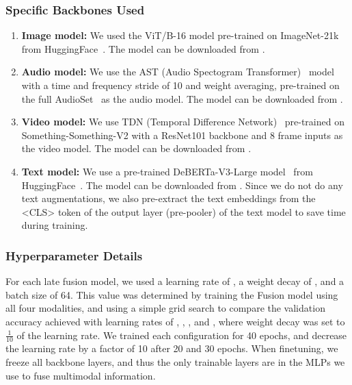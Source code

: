 \documentclass[runningheads]{llncs}
\begin{document}
\subsubsection{Specific Backbones Used} 
\begin{enumerate}
    \item \textbf{Image model:} We used the ViT/B-16 model pre-trained on ImageNet-21k from HuggingFace~\cite{wolf2020huggingface}. The model can be downloaded from \href{https://huggingface.co/google/vit-base-patch16-224-in21k}{}.
    \item \textbf{Audio model:} We use the AST (Audio Spectogram Transformer)~\cite{gong2021ast} model with a time and frequency stride of 10 and weight averaging, pre-trained on the full AudioSet~\cite{gemmeke2017audioset} as the audio model. The model can be downloaded from \href{https://github.com/YuanGongND/ast}{}. 
    \item \textbf{Video model:} We use TDN (Temporal Difference Network)~\cite{wang2021tdn} pre-trained on Something-Something-V2 with a ResNet101 backbone and 8 frame inputs as the video model. The model can be downloaded from \href{https://github.com/MCG-NJU/TDN}{}. 
    \item \textbf{Text model:} We use a pre-trained DeBERTa-V3-Large model~\cite{he2021debertav3} from HuggingFace~\cite{wolf2020huggingface}. The model can be downloaded from \href{https://huggingface.co/microsoft/deberta-v3-large}{}. Since we do not do any text augmentations, we also pre-extract the text embeddings from the <CLS> token of the output layer (pre-pooler) of the text model to save time during training. 
\end{enumerate}

\subsubsection{Hyperparameter Details} For each late fusion model, we used a learning rate of , a weight decay of , and a batch size of 64. This value was determined by training the Fusion model using all four modalities, and using a simple grid search to compare the validation accuracy achieved with learning rates of , , , and , where weight decay was set to $\frac{1}{10}$ of the learning rate. We trained each configuration for 40 epochs, and decrease the learning rate by a factor of 10 after 20 and 30 epochs. When finetuning, we freeze all backbone layers, and thus the only trainable layers are in the MLPs we use to fuse multimodal information. 
\end{document}
